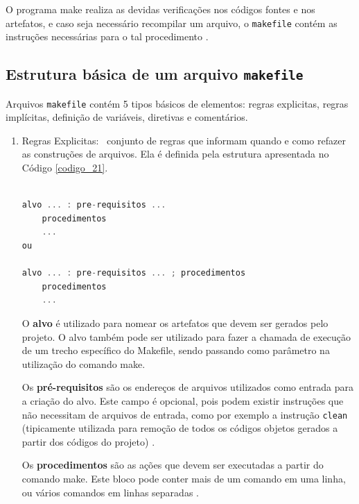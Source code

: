 O programa make realiza as devidas verificações nos códigos fontes e
 nos artefatos, e caso seja necessário recompilar um arquivo, o
 \texttt{makefile} contém as instruções necessárias para o tal procedimento
 \cite[pág. 1]{ref45}.


\subsection{Estrutura básica de um arquivo \texttt{makefile}}

Arquivos \texttt{makefile} contém 5 tipos básicos de elementos: regras explicitas,
 regras implícitas, definição de variáveis, diretivas e comentários.

\begin{enumerate}

    \item Regras Explicitas: \
        conjunto de regras que informam quando e como refazer as construções
         de arquivos. Ela é definida pela estrutura apresentada no Código \ref{codigo_21}.


        \begin{lstlisting}[language=C++,caption={
                                     			Regras explicitas de Makefile},
                                                        label=codigo_21]

alvo ... : pre-requisitos ... 
    procedimentos
	...
ou 

alvo ... : pre-requisitos ... ; procedimentos
    procedimentos
    ...

        \end{lstlisting}


 O \textbf{alvo} é utilizado para nomear os artefatos que devem ser gerados pelo projeto.
 O alvo também pode ser utilizado para fazer a chamada de execução de um trecho
 específico do Makefile,  sendo passando como parâmetro na utilização do comando
 make.

 Os \textbf{pré-requisitos} são os endereços de arquivos utilizados como entrada para a 
criação do alvo. Este campo é opcional, pois podem existir instruções que não
 necessitam de arquivos de entrada, como por exemplo a instrução \texttt{clean}
 (tipicamente utilizada para remoção de todos os códigos objetos gerados a partir
 dos códigos do projeto) \cite[pág. 1]{ref45}.

Os \textbf{procedimentos} são as ações que devem ser executadas a partir do comando make.
Este bloco pode conter mais de um comando em uma linha, ou  vários comandos em
 linhas separadas \cite[pág. 1]{ref45}.


\end{enumerate}

